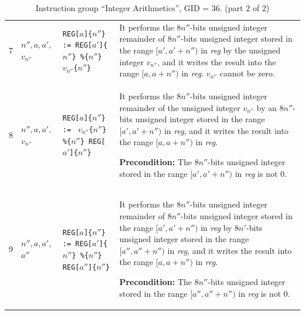 \documentclass[10pt,twocolumn]{article}
\begin{document}
\begin{table}[!h]
\begin{center}
\begin{tabular}{lp{1.2cm}p{5.5cm}p{7.5cm}}
7 & $ n'',a,a', $ \newline $ v_{n''} $ %
& \texttt{REG[}$ a $\texttt{]\{}$ n'' $\texttt{\} := REG[}$ a' $\texttt{]\{}$
n'' $\texttt{\} \%\{}$ n'' $\texttt{\}} $ v_{n''} $\texttt{\{}$ n''
$\texttt{\}} %
& It performs the $ 8n'' $-bits unsigned integer remainder of $ 8n'' $-bits
unsigned integer stored in the range $ [a',a'+n'') $ in \textit{reg} by the
unsigned integer $ v_{n''} $, and it writes the result into the range $ [a,a+n'')
$ in \textit{reg}. $ v_{n''} $ cannot be zero. \\

8 & $ n'',a,a', $ \newline $ v_{n''} $ %
& \texttt{REG[}$ a $\texttt{]\{}$ n'' $\texttt{\} := } $ v_{n''} $\texttt{\{}$
n'' $\texttt{\}} \texttt{\%\{}$ n'' $\texttt{\} REG[}$ a' $\texttt{]\{}$ n''
$\texttt{\}} %
& It performs the $ 8n'' $-bits unsigned integer remainder of the unsigned
integer  $ v_{n''} $ by an $ 8n'' $-bits unsigned integer stored in the range $
[a',a'+n'') $ in \textit{reg}, and it writes the result into the range $
[a,a+n'') $ in \textit{reg}.

\textbf{Precondition:} The $ 8n'' $-bits unsigned integer stored in the range $
[a',a'+n'') $ in \textit{reg} is not 0. \\


9 & $ n'',a,a',$ \newline $ a'' $ %
& \texttt{REG[}$ a $\texttt{]\{}$ n'' $\texttt{\} := REG[}$ a' $\texttt{]\{}$
n'' $\texttt{\} \%\{}$ n'' $\texttt{\} REG[}$ a'' $\texttt{]\{}$ n''
$\texttt{\}} %
& It performs the $ 8n'' $-bits unsigned integer remainder of $ 8n'' $-bits
unsigned integer stored in the range $ [a',a'+n'') $ in \textit{reg} by $ 8n'
$-bits unsigned integer stored in the range $ [a'',a''+n'') $ in \textit{reg},
and it writes the result into the range $ [a,a+n'') $ in \textit{reg}.

\textbf{Precondition:} The $ 8n'' $-bits unsigned integer stored in the range $
[a'',a''+n'') $ in \textit{reg} is not 0. \\

\end{tabular}
\end{center}
\caption{Instruction group ``Integer Arithmetics'', GID = 36. (part 2 of 2)}
\end{table}

\clearpage

\end{document}
